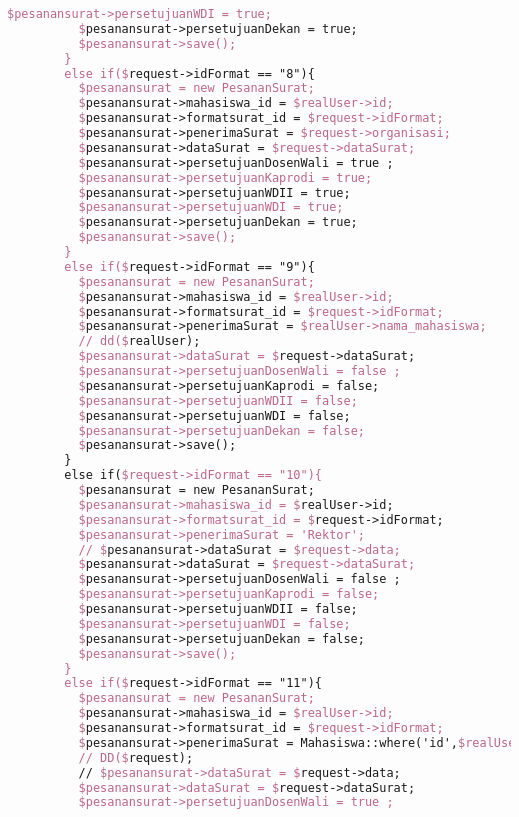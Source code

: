 \begin{lstlisting}[language=tex,basicstyle=\tiny,caption=PesanansuratController.php]
          $pesanansurat->persetujuanWDI = true;
          $pesanansurat->persetujuanDekan = true;
          $pesanansurat->save();
        }
        else if($request->idFormat == "8"){
          $pesanansurat = new PesananSurat;
          $pesanansurat->mahasiswa_id = $realUser->id;
          $pesanansurat->formatsurat_id = $request->idFormat;
          $pesanansurat->penerimaSurat = $request->organisasi;
          $pesanansurat->dataSurat = $request->dataSurat;
          $pesanansurat->persetujuanDosenWali = true ;
          $pesanansurat->persetujuanKaprodi = true;
          $pesanansurat->persetujuanWDII = true;
          $pesanansurat->persetujuanWDI = true;
          $pesanansurat->persetujuanDekan = true;
          $pesanansurat->save();
        }
        else if($request->idFormat == "9"){
          $pesanansurat = new PesananSurat;
          $pesanansurat->mahasiswa_id = $realUser->id;
          $pesanansurat->formatsurat_id = $request->idFormat;
          $pesanansurat->penerimaSurat = $realUser->nama_mahasiswa;
          // dd($realUser);
          $pesanansurat->dataSurat = $request->dataSurat;
          $pesanansurat->persetujuanDosenWali = false ;
          $pesanansurat->persetujuanKaprodi = false;
          $pesanansurat->persetujuanWDII = false;
          $pesanansurat->persetujuanWDI = false;
          $pesanansurat->persetujuanDekan = false;
          $pesanansurat->save();
        }
        else if($request->idFormat == "10"){
          $pesanansurat = new PesananSurat;
          $pesanansurat->mahasiswa_id = $realUser->id;
          $pesanansurat->formatsurat_id = $request->idFormat;
          $pesanansurat->penerimaSurat = 'Rektor';
          // $pesanansurat->dataSurat = $request->data;
          $pesanansurat->dataSurat = $request->dataSurat;
          $pesanansurat->persetujuanDosenWali = false ;
          $pesanansurat->persetujuanKaprodi = false;
          $pesanansurat->persetujuanWDII = false;
          $pesanansurat->persetujuanWDI = false;
          $pesanansurat->persetujuanDekan = false;
          $pesanansurat->save();
        }
        else if($request->idFormat == "11"){
          $pesanansurat = new PesananSurat;
          $pesanansurat->mahasiswa_id = $realUser->id;
          $pesanansurat->formatsurat_id = $request->idFormat;
          $pesanansurat->penerimaSurat = Mahasiswa::where('id',$realUser->id)->first()->dosen->nama_dosen;
          // DD($request);
          // $pesanansurat->dataSurat = $request->data;
          $pesanansurat->dataSurat = $request->dataSurat;
          $pesanansurat->persetujuanDosenWali = true ;

\end{lstlisting}
